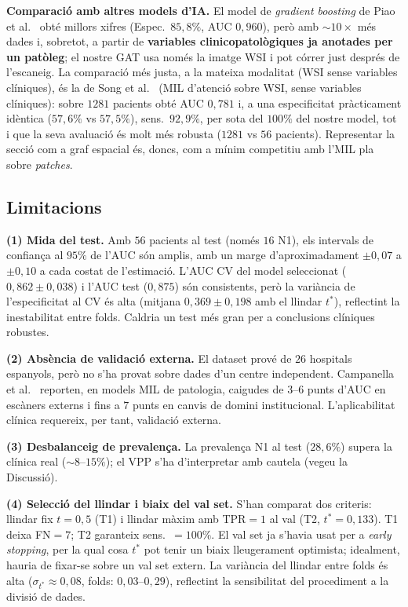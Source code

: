 \documentclass[10pt,a4paper,twocolumn,twoside]{article}
\begin{document}
\textbf{Comparació amb altres models d'IA.} El model de \textit{gradient boosting} de Piao et
al.~\cite{piao2023ai} obté millors xifres (Espec.\ $85{,}8\%$, AUC $0{,}960$), però amb
$\sim\!10\!\times$ més dades i, sobretot, a partir de \textbf{variables clinicopatològiques ja
anotades per un patòleg}; el nostre GAT usa només la imatge WSI i pot córrer just després de
l'escaneig. La comparació més justa, a la mateixa modalitat (WSI sense variables clíniques), és la de Song et
al.~\cite{song2024lnm} (MIL d'atenció sobre WSI, sense variables clíniques): sobre $1281$
pacients obté AUC $0{,}781$ i, a una especificitat pràcticament idèntica ($57{,}6\%$ vs
$57{,}5\%$), sens.\ $92{,}9\%$, per sota del $100\%$ del nostre model, tot i que la seva
avaluació és molt més robusta ($1281$ vs $56$ pacients). Representar la secció com a graf
espacial és, doncs, com a mínim competitiu amb l'MIL pla sobre \textit{patches}.

\subsection{Limitacions}
\label{sec:limitacions}

\textbf{(1) Mida del test.}
Amb $56$ pacients al test (només $16$ N1), els intervals de confiança al $95\%$ de l'AUC
són amplis, amb un marge d'aproximadament $\pm0{,}07$ a $\pm0{,}10$ a cada costat de l'estimació. L'AUC CV del model seleccionat ($0{,}862\!\pm\!0{,}038$)
i l'AUC test ($0{,}875$) són consistents, però la variància de l'especificitat al CV és alta
(mitjana $0{,}369\!\pm\!0{,}198$ amb el llindar $t^*$), reflectint la inestabilitat
entre folds. Caldria un test més gran per a conclusions clíniques robustes.

\textbf{(2) Absència de validació externa.}
El dataset prové de $26$ hospitals espanyols, però no s'ha provat sobre dades d'un centre
independent. Campanella et al.~\cite{campanella2019} reporten, en models MIL de patologia,
caigudes de $3$–$6$ punts d'AUC en escàners externs i fins a $7$ punts en canvis de
domini institucional. L'aplicabilitat clínica requereix, per tant, validació externa.

\textbf{(3) Desbalanceig de prevalença.}
La prevalença N1 al test ($28{,}6\%$) supera la clínica real ($\sim\!8$–$15\%$); el VPP
s'ha d'interpretar amb cautela (vegeu la Discussió).

\textbf{(4) Selecció del llindar i biaix del val set.}
S'han comparat dos criteris: llindar fix $t\!=\!0{,}5$ (T1) i llindar màxim amb TPR$=1$ al val
(T2, $t^*\!=\!0{,}133$). T1 deixa FN$=7$; T2 garanteix sens.\ $=\!100\%$. El val set ja
s'havia usat per a \textit{early stopping}, per la qual cosa $t^*$ pot tenir un biaix
lleugerament optimista; idealment, hauria de fixar-se sobre un val set extern. La variància del
llindar entre folds és alta ($\sigma_{t^*}\!\approx\!0{,}08$, folds: $0{,}03$--$0{,}29$),
reflectint la sensibilitat del procediment a la divisió de dades.
\end{document}
